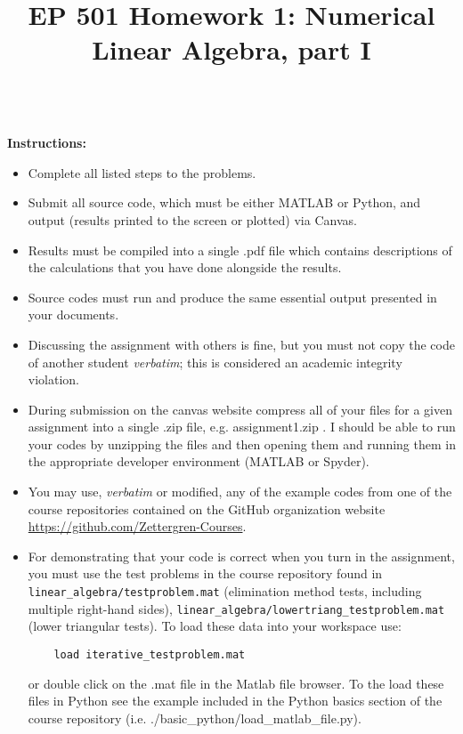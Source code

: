 \documentclass{article}
\begin{document}
\title{EP 501 Homework 1:  Numerical Linear Algebra, part I}

\maketitle

~\\
\textbf{Instructions:}  
\begin{itemize}
  \item Complete all listed steps to the problems.
  \item Submit all source code, which must be either MATLAB or Python, and output (results printed to the screen or plotted) via Canvas.  
  \item Results must be compiled into a single .pdf file which contains descriptions of the calculations that you have done alongside the results.  
  \item Source codes must run and produce the same essential output presented in your documents.  
  \item Discussing the assignment with others is fine, but you must not copy the code of another student \emph{verbatim}; this is considered an academic integrity violation.  
  \item During submission on the canvas website compress all of your files for a given assignment into a single .zip file, e.g. \textsf{assignment1.zip} .  I should be able to run your codes by unzipping the files and then opening them and running them in the appropriate developer environment (MATLAB or Spyder).  
  \item You may use, \emph{verbatim} or modified, any of the example codes from one of the course repositories contained on the GitHub organization website  \url{https://github.com/Zettergren-Courses}.
  \item For demonstrating that your code is correct when you turn in the assignment, you must use the test problems in the course repository found in \texttt{linear\_algebra/testproblem.mat} (elimination method tests, including multiple right-hand sides), \texttt{linear\_algebra/lowertriang\_testproblem.mat} (lower triangular tests).  To load these data into your workspace use:
    \begin{verbatim}
    load iterative_testproblem.mat
    \end{verbatim}
    or double click on the .mat file in the Matlab file browser.  To the load these files in Python see the example included in the Python basics section of the course repository (i.e. ./basic\_python/load\_matlab\_file.py).  
\end{itemize}
\end{document}
